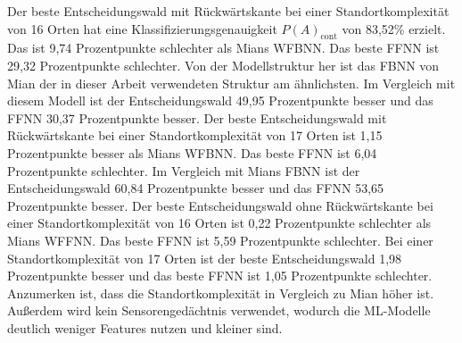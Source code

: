 Der beste Entscheidungswald mit Rückwärtskante bei einer Standortkomplexität von 16 Orten hat eine Klassifizierungsgenauigkeit $P(A)_{\text{cont}}$ von 83,52\% erzielt.
Das ist 9,74 Prozentpunkte schlechter als Mians WFBNN.
Das beste FFNN ist 29,32 Prozentpunkte schlechter.
Von der Modellstruktur her ist das FBNN von Mian der in dieser Arbeit verwendeten Struktur am ähnlichsten.
Im Vergleich mit diesem Modell ist der Entscheidungswald 49,95 Prozentpunkte besser und das FFNN 30,37 Prozentpunkte besser.
\newline
\newline
Der beste Entscheidungswald mit Rückwärtskante bei einer Standortkomplexität von 17 Orten ist 1,15 Prozentpunkte besser als Mians WFBNN.
Das beste FFNN ist 6,04 Prozentpunkte schlechter.
Im Vergleich mit Mians FBNN ist der Entscheidungswald 60,84 Prozentpunkte besser und das FFNN 53,65 Prozentpunkte besser.
\newline
\newline
Der beste Entscheidungswald ohne Rückwärtskante bei einer Standortkomplexität von 16 Orten ist 0,22 Prozentpunkte schlechter als Mians WFFNN.
Das beste FFNN ist 5,59 Prozentpunkte schlechter.
Bei einer Standortkomplexität von 17 Orten ist der beste Entscheidungswald 1,98 Prozentpunkte besser und das beste FFNN ist 1,05 Prozentpunkte schlechter.
Anzumerken ist, dass die Standortkomplexität in Vergleich zu Mian höher ist.
Außerdem wird kein Sensorengedächtnis verwendet, wodurch die ML-Modelle deutlich weniger Features nutzen und kleiner sind.

